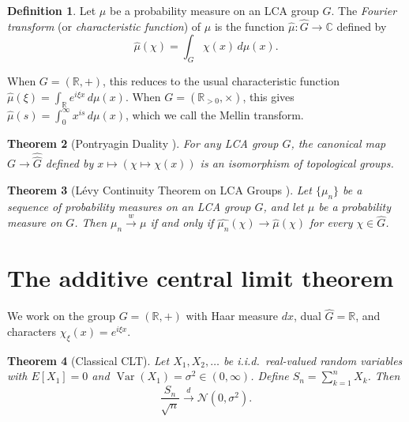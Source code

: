 \documentclass[12pt]{amsart}
\newtheorem{theorem}{Theorem}[section]
\theoremstyle{definition}
\newtheorem{definition}[theorem]{Definition}
\theoremstyle{remark}
\DeclareMathOperator{\Var}{Var}
\newcommand{\R}{\mathbb{R}}
\newcommand{\Rpos}{\mathbb{R}_{>0}}
\newcommand{\cN}{\mathcal{N}}
\begin{document}
\begin{definition}\label{def:FT}
Let $\mu$ be a probability measure on an LCA group $G$. The \emph{Fourier transform} (or \emph{characteristic function}) of $\mu$ is the function $\widehat{\mu} : \widehat{G} \to \mathbb{C}$ defined by
\[
\widehat{\mu}(\chi) = \int_G \chi(x) \, d\mu(x).
\]
\end{definition}

When $G = (\R, +)$, this reduces to the usual characteristic function $\widehat{\mu}(\xi) = \int_\R e^{i\xi x}\, d\mu(x)$. When $G = (\Rpos, \times)$, this gives $\widehat{\mu}(s) = \int_0^\infty x^{is}\, d\mu(x)$, which we call the Mellin transform.

\begin{theorem}[Pontryagin Duality {\cite[Theorem~1.7.2]{Rudin}}]\label{thm:pontryagin}
For any LCA group $G$, the canonical map $G \to \widehat{\widehat{G}}$ defined by $x \mapsto (\chi \mapsto \chi(x))$ is an isomorphism of topological groups.
\end{theorem}

\begin{theorem}[L\'evy Continuity Theorem on LCA Groups {\cite[Theorem~VI.4.2]{Parthasarathy}}]\label{thm:levy}
Let $\{\mu_n\}$ be a sequence of probability measures on an LCA group $G$, and let $\mu$ be a probability measure on $G$. Then $\mu_n \xrightarrow{w} \mu$ if and only if $\widehat{\mu_n}(\chi) \to \widehat{\mu}(\chi)$ for every $\chi \in \widehat{G}$.
\end{theorem}

\section{The additive central limit theorem}

We work on the group $G = (\R, +)$ with Haar measure $dx$, dual $\widehat{G} = \R$, and characters $\chi_\xi(x) = e^{i\xi x}$.

\begin{theorem}[Classical CLT]\label{thm:add-clt}
Let $X_1, X_2, \ldots$ be i.i.d.\ real-valued random variables with $E[X_1] = 0$ and $\Var(X_1) = \sigma^2 \in (0, \infty)$. Define $S_n = \sum_{k=1}^n X_k$. Then
\[
\frac{S_n}{\sqrt{n}} \xrightarrow{d} \cN(0, \sigma^2).
\]
\end{theorem}
\end{document}
